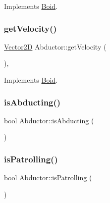 Implements \hyperlink{class_boid_a32f7601f73e7a109bbd79d43b15d2272}{Boid}.

\hypertarget{class_abductor_adb812ea046ef9fc984b5035c7fb6ce3f}{}\label{class_abductor_adb812ea046ef9fc984b5035c7fb6ce3f} 
\subsubsection{\texorpdfstring{get\+Velocity()}{getVelocity()}}
{\footnotesize\ttfamily \hyperlink{class_vector2_d}{Vector2D} Abductor\+::get\+Velocity (\begin{DoxyParamCaption}{ }\end{DoxyParamCaption})\hspace{0.3cm}{\ttfamily [override]}, {\ttfamily [virtual]}}



Implements \hyperlink{class_boid_a58472dead1db1399b75090bf48184619}{Boid}.

\hypertarget{class_abductor_a3a22e52687c4f1b70eba475617fec3a4}{}\label{class_abductor_a3a22e52687c4f1b70eba475617fec3a4} 
\subsubsection{\texorpdfstring{is\+Abducting()}{isAbducting()}}
{\footnotesize\ttfamily bool Abductor\+::is\+Abducting (\begin{DoxyParamCaption}{ }\end{DoxyParamCaption})}

\hypertarget{class_abductor_a76abe6a51994ef35787351c9cd49ba6c}{}\label{class_abductor_a76abe6a51994ef35787351c9cd49ba6c} 
\subsubsection{\texorpdfstring{is\+Patrolling()}{isPatrolling()}}
{\footnotesize\ttfamily bool Abductor\+::is\+Patrolling (\begin{DoxyParamCaption}{ }\end{DoxyParamCaption})}

\hypertarget{class_abductor_ab862b53793f2722546e3e1be05bd546e}{}\label{class_abductor_ab862b53793f2722546e3e1be05bd546e} 
